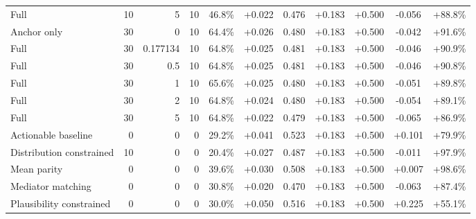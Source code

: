 \begin{table}[htbp]
\begin{tabular}{lrrrccccccc}
Full & 10 & 5 & 10 & 46.8\% & +0.022 & 0.476 & +0.183 & +0.500 & -0.056 & +88.8\% \\
Anchor only & 30 & 0 & 10 & 64.4\% & +0.026 & 0.480 & +0.183 & +0.500 & -0.042 & +91.6\% \\
Full & 30 & 0.177134 & 10 & 64.8\% & +0.025 & 0.481 & +0.183 & +0.500 & -0.046 & +90.9\% \\
Full & 30 & 0.5 & 10 & 64.8\% & +0.025 & 0.481 & +0.183 & +0.500 & -0.046 & +90.8\% \\
Full & 30 & 1 & 10 & 65.6\% & +0.025 & 0.480 & +0.183 & +0.500 & -0.051 & +89.8\% \\
Full & 30 & 2 & 10 & 64.8\% & +0.024 & 0.480 & +0.183 & +0.500 & -0.054 & +89.1\% \\
Full & 30 & 5 & 10 & 64.8\% & +0.022 & 0.479 & +0.183 & +0.500 & -0.065 & +86.9\% \\
Actionable baseline & 0 & 0 & 0 & 29.2\% & +0.041 & 0.523 & +0.183 & +0.500 & +0.101 & +79.9\% \\
Distribution constrained & 10 & 0 & 0 & 20.4\% & +0.027 & 0.487 & +0.183 & +0.500 & -0.011 & +97.9\% \\
Mean parity & 0 & 0 & 0 & 39.6\% & +0.030 & 0.508 & +0.183 & +0.500 & +0.007 & +98.6\% \\
Mediator matching & 0 & 0 & 0 & 30.8\% & +0.020 & 0.470 & +0.183 & +0.500 & -0.063 & +87.4\% \\
Plausibility constrained & 0 & 0 & 0 & 30.0\% & +0.050 & 0.516 & +0.183 & +0.500 & +0.225 & +55.1\% \\
\bottomrule
\end{tabular}
\end{table}